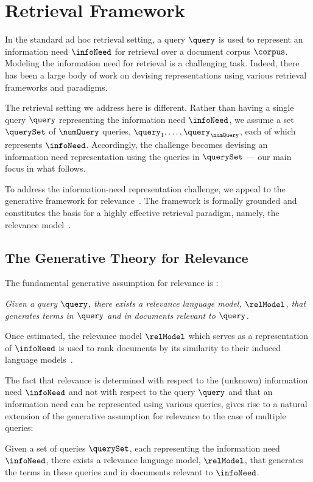 \setlength{\abovedisplayskip}{2pt}
\setlength{\belowdisplayskip}{2pt}
\setlength{\abovedisplayshortskip}{2pt}
\setlength{\belowdisplayshortskip}{2pt} 
\allowdisplaybreaks

\section{Retrieval Framework}
\label{sec:approach}
In the standard ad hoc retrieval setting, a query $\query$ is used to
represent an information need $\infoNeed$ for retrieval over a
document corpus $\corpus$.
Modeling the information need for retrieval is a challenging task.
Indeed, there has been a large body of work on devising
representations using various retrieval frameworks and paradigms.

The retrieval setting we address here is different.
Rather than having a single query $\query$ representing the
information need $\infoNeed$, we assume a set $\querySet$ of
$\numQuery$ queries, $\query_1, \ldots,\query_{\numQuery}$, each of
which represents $\infoNeed$.
Accordingly, the challenge becomes devising an information need
representation using the queries in $\querySet$ --- our main focus in
what follows.

To address the information-need representation challenge, we appeal
to the generative framework for relevance~\cite{Lavrenko+Croft:03a}.
The framework is formally grounded and constitutes the basis for a
highly effective retrieval paradigm, namely, the relevance
model~\cite{Lavrenko+Croft:03a,Abdul-Jaleel+al:04a}.

\subsection{The Generative Theory for Relevance}
\label{sec:genTheory}

The fundamental generative assumption for relevance is
\cite{Lavrenko+Croft:03a}:
\begin{assumption}
\label{assum:origGen}
{\em Given a query $\query$, there exists a relevance language model,
$\relModel$, that generates terms in $\query$ and in documents
relevant to $\query$.
}
\end{assumption}
Once estimated, the relevance model $\relModel$ which serves as a representation
of $\infoNeed$ is used to rank documents by its similarity to their induced language models~\cite{Lavrenko+Croft:03a}.

The fact that relevance is determined with
respect to the (unknown) information need $\infoNeed$ and not with
respect to the query $\query$ and that an information need can be
represented using various queries, gives rise to a natural extension
of the generative assumption for relevance to the case of multiple
queries:
\begin{assumption}
\label{assum:extend}
  Given a set of queries $\querySet$, each 
  representing the information need $\infoNeed$, there exists a relevance
  language model, $\relModel$, that generates the terms in these
  queries and in documents relevant to $\infoNeed$.
\end{assumption}

